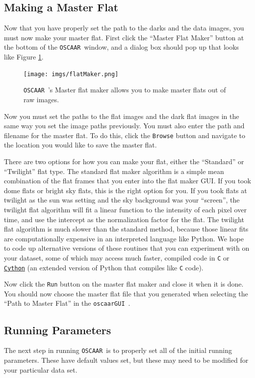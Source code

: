 \documentclass[a4paper]{article}
\newcommand{\code}[1]{\texttt{#1}}
\newcommand{\oscaar}{\code{OSCAAR}~}
\newcommand{\gui}{\code{oscaarGUI}~}
\begin{document}
\subsection{Making a Master Flat}
Now that you have properly set the path to the darks and the data images, you must now make your master flat. First click the ``Master Flat Maker'' button at the bottom of the \oscaar window, and a dialog box should pop up that looks like Figure \ref{fig:flats}.
\begin{figure}[H]
\begin{center}
\texttt{[image: imgs/flatMaker.png]}
\caption{\oscaar's Master flat maker allows you to make master flats out of raw images.}
\label{fig:flats}
\end{center}	
\end{figure}

Now you must set the paths to the flat images and the dark flat images in the same way you set the image paths previously. You must also enter the path and filename for the master flat. To do this, click the \code{Browse} button and navigate to the location you would like to save the master flat. 

There are two options for how you can make your flat, either  the ``Standard'' or ``Twilight'' flat type. The standard flat maker algorithm is a simple mean combination of the flat frames that you enter into the flat maker GUI. If you took dome flats or bright sky flats, this is the right option for you. If you took flats at twilight as the sun was setting and the sky background was your ``screen'', the twilight flat algorithm will fit a linear function to the intensity of each pixel over time, and use the intercept as the normalization factor for the flat. The twilight flat algorithm is much slower than the standard method, because those linear fits are computationally expensive in an interpreted language like Python. We hope to code up alternative versions of these routines that you can experiment with on your dataset, some of which may access much faster, compiled code in \code{C} or \code{\href{http://cython.org/}{Cython}} (an extended version of Python that compiles like \code{C} code).

Now click the \code{Run} button on the master flat maker and close it when it is done. You should now choose the master flat file that you generated when selecting the ``Path to Master Flat'' in the \gui. 

\subsection{Running Parameters}
The next step in running \oscaar is to properly set all of the initial running parameters. These have default values set, but these may need to be modified for your particular data set.
\end{document}
